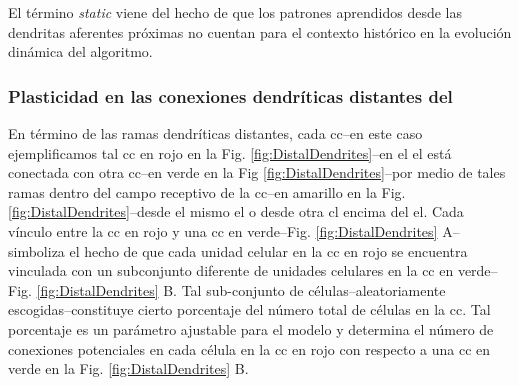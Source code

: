 El término \textit{static} viene del hecho de que los patrones aprendidos desde las dendritas aferentes próximas no cuentan para el contexto histórico en la evolución dinámica del algoritmo.







\subsubsection{Plasticidad en las conexiones dendríticas distantes del }
\label{distal_dendrites}

En término de las ramas dendríticas distantes, cada \gls{cc}--en este caso ejemplificamos tal \gls{cc} en rojo en la Fig. \ref{fig:DistalDendrites}--en el \gls{el} está conectada con otra \gls{cc}--en verde en la Fig \ref{fig:DistalDendrites}--por medio de tales ramas dentro del campo receptivo de la \gls{cc}--en amarillo en la Fig. \ref{fig:DistalDendrites}--desde el mismo \gls{el} o desde otra \gls{cl} encima del \gls{el}. Cada vínculo entre la \gls{cc} en rojo y una \gls{cc} en verde--Fig. \ref{fig:DistalDendrites} A--simboliza el hecho de que cada unidad celular en la \gls{cc} en rojo se encuentra vinculada con un subconjunto diferente de unidades celulares en la \gls{cc} en verde--Fig. \ref{fig:DistalDendrites} B. Tal sub-conjunto de células--aleatoriamente escogidas--constituye cierto porcentaje del número total de células en la \gls{cc}. Tal porcentaje es un parámetro ajustable para el modelo y determina el número de conexiones potenciales en cada célula en la \gls{cc} en rojo con respecto a una \gls{cc} en verde en la Fig. \ref{fig:DistalDendrites} B.


